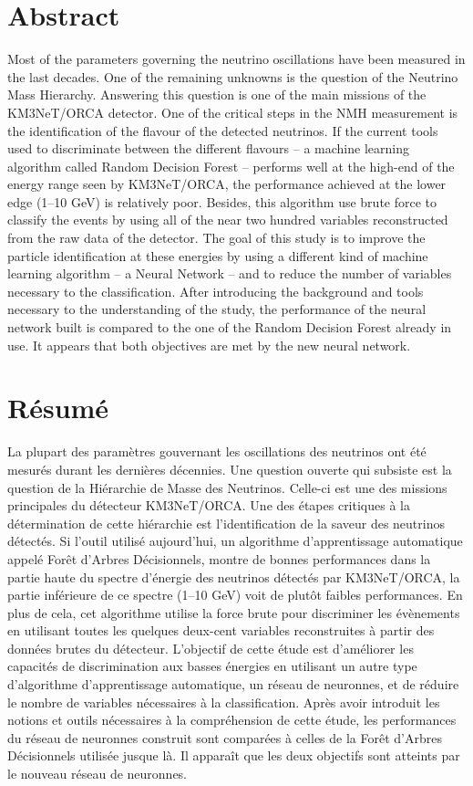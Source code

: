 \chapter*{Abstract}

Most of the parameters governing the neutrino oscillations have been measured in the last decades. One of the remaining unknowns is the question of the Neutrino Mass Hierarchy. Answering this question is one of the main missions of the KM3NeT/ORCA detector. One of the critical steps in the NMH measurement is the identification of the flavour of the detected neutrinos. If the current tools used to discriminate between the different flavours -- a machine learning algorithm called Random Decision Forest -- performs well at the high-end of the energy range seen by KM3NeT/ORCA, the performance achieved at the lower edge (1--10 GeV) is relatively poor. Besides, this algorithm use brute force to classify the events by using all of the near two hundred variables reconstructed from the raw data of the detector. The goal of this study is to improve the particle identification at these energies by using a different kind of machine learning algorithm -- a Neural Network -- and to reduce the number of variables necessary to the classification. After introducing the background and tools necessary to the understanding of the study, the performance of the neural network built is compared to the one of the Random Decision Forest already in use. It appears that both objectives are met by the new neural network.

{\let\clearpage\relax \chapter*{Résumé}}

La plupart des paramètres gouvernant les oscillations des neutrinos ont été mesurés durant les dernières décennies. Une question ouverte qui subsiste est la question de la Hiérarchie de Masse des Neutrinos. Celle-ci est une des missions principales du détecteur KM3NeT/ORCA. Une des étapes critiques à la détermination de cette hiérarchie est l'identification de la saveur des neutrinos détectés. Si l'outil utilisé aujourd'hui, un algorithme d'apprentissage automatique appelé Forêt d'Arbres Décisionnels, montre de bonnes performances dans la partie haute du spectre d'énergie des neutrinos détectés par KM3NeT/ORCA, la partie inférieure de ce spectre (1--10 GeV) voit de plutôt faibles performances. En plus de cela, cet algorithme utilise la force brute pour discriminer les évènements en utilisant toutes les quelques deux-cent variables reconstruites à partir des données brutes du détecteur. L'objectif de cette étude est d'améliorer les capacités de discrimination aux basses énergies en utilisant un autre type d'algorithme d'apprentissage automatique, un réseau de neuronnes, et de réduire le nombre de variables nécessaires à la classification. Après avoir introduit les notions et outils nécessaires à la compréhension de cette étude, les performances du réseau de neuronnes construit sont comparées à celles de la Forêt d'Arbres Décisionnels utilisée jusque là. Il apparaît que les deux objectifs sont atteints par le nouveau réseau de neuronnes.
